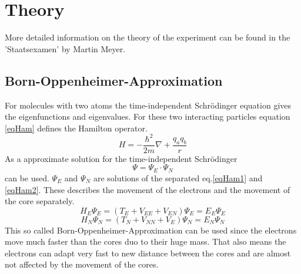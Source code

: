 \section{Theory}
More detailed information on the theory of the experiment can be found in the 'Staatsexamen' by Martin Meyer.\cite{Anleitung}
\subsection{Born-Oppenheimer-Approximation}
For molecules with two atoms the time-independent Schrödinger equation gives the eigenfunctions and eigenvalues. For these two interacting particles equation \ref{eqHam} defines the Hamilton operator.
\begin{equation}
	H=-\frac{\hbar^2}{2m}\nabla+\frac{q_aq_b}{r}
	\label{eqHam}
\end{equation}
As a approximate solution for the time-independent Schrödinger
\begin{equation}
	\Psi=\Psi_E\cdot\Psi_N 
\end{equation}
can be used. $\Psi_E$ and $\Psi_N$ are solutions of the separated eq.\ref{eqHam1} and \ref{eqHam2}.  These describes the movement of the electrons and the movement of the core separately. 
\begin{equation}
	H_E\Psi_E=(T_E+V_{EE}+V_{EN})\Psi_E=E_E\Psi_E
	\label{eqHam1}
\end{equation}
\begin{equation}
H_N\Psi_N=(T_N+V_{NN}+V_{E})\Psi_N=E_N\Psi_N
\label{eqHam2}
\end{equation}
This so called Born-Oppenheimer-Approximation can be used since the electrons move much faster than the cores duo to their huge mass. That also means the electrons can adapt very fast to new distance between the cores and are almost not affected by the movement of the cores.

